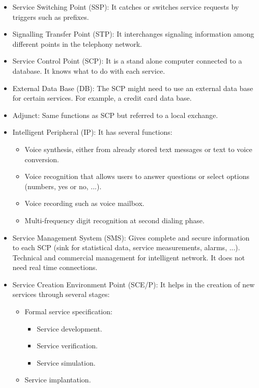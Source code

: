 \documentclass[
	12pt,
	twoside
]{book}
\begin{document}
\begin{itemize}
	\item Service Switching Point (SSP): It catches or switches service requests by triggers such as prefixes.
	\item Signalling Transfer Point (STP): It interchanges signaling information among different points in the telephony network.
	\item Service Control Point (SCP): It is a stand alone computer connected to a database. It knows what to do with each service.
	\item External Data Base (DB): The SCP might need to use an external data base for certain services. For example, a credit card data base.
	\item Adjunct: Same functions as SCP but referred to a local exchange.
	\item {
		Intelligent Peripheral (IP): It has several functions:
		\begin{itemize}
			\item Voice synthesis, either from already stored text messages or text to voice conversion.
			\item Voice recognition that allows users to answer questions or select options (numbers, yes or no, ...).
			\item Voice recording such as voice mailbox.
			\item Multi-frequency digit recognition at second dialing phase.
		\end{itemize}
	}
	\item Service Management System (SMS): Gives complete and secure information to each SCP (sink for statistical data, service measurements, alarms, ...). Technical and commercial management for intelligent network. It does not need real time connections.
	\item {
		Service Creation Environment Point (SCE/P): It helps in the creation of new services through several stages:
		\begin{itemize}
			\item {
				Formal service specification:
				\begin{itemize}
					\item Service development.
					\item Service verification.
					\item Service simulation.
				\end{itemize}
			}
			\item Service implantation.
		\end{itemize}
	}
\end{itemize}
\end{document}
